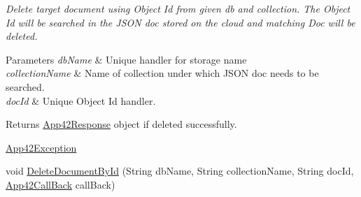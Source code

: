 \begin{DoxyCompactItemize}
\begin{DoxyCompactList}\small\item\em Delete target document using Object Id from given db and collection. The Object Id will be searched in the J\+S\+O\+N doc stored on the cloud and matching Doc will be deleted. 
\begin{DoxyParams}{Parameters}
{\em db\+Name} & Unique handler for storage name\\
\hline
{\em collection\+Name} & Name of collection under which J\+S\+O\+N doc needs to be searched.\\
\hline
{\em doc\+Id} & Unique Object Id handler.\\
\hline
\end{DoxyParams}
\begin{DoxyReturn}{Returns}
\hyperlink{classcom_1_1shephertz_1_1app42_1_1paas_1_1sdk_1_1csharp_1_1_app42_response}{App42\+Response} object if deleted successfully.
\end{DoxyReturn}
\hyperlink{classcom_1_1shephertz_1_1app42_1_1paas_1_1sdk_1_1csharp_1_1_app42_exception}{App42\+Exception}\end{DoxyCompactList}\item 
\hypertarget{classcom_1_1shephertz_1_1app42_1_1paas_1_1sdk_1_1csharp_1_1storage_1_1_storage_service_abe2a0c5fbe85fe2dbf39fd527a939a4f}{void \hyperlink{classcom_1_1shephertz_1_1app42_1_1paas_1_1sdk_1_1csharp_1_1storage_1_1_storage_service_abe2a0c5fbe85fe2dbf39fd527a939a4f}{Delete\+Document\+By\+Id} (String db\+Name, String collection\+Name, String doc\+Id, \hyperlink{interfacecom_1_1shephertz_1_1app42_1_1paas_1_1sdk_1_1csharp_1_1_app42_call_back}{App42\+Call\+Back} call\+Back)}\label{classcom_1_1shephertz_1_1app42_1_1paas_1_1sdk_1_1csharp_1_1storage_1_1_storage_service_abe2a0c5fbe85fe2dbf39fd527a939a4f}


\end{DoxyCompactItemize}
